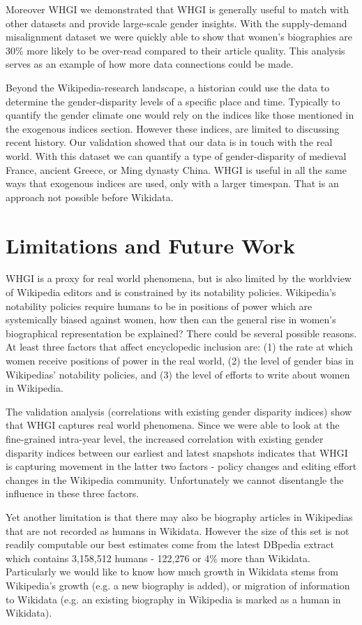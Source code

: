 \documentclass{sig-alternate-05-2015}
\begin{document}
Moreover WHGI we demonstrated that WHGI is generally useful to match with other datasets and provide large-scale gender insights. With the supply-demand misalignment dataset we were quickly able to show that women's biographies are 30\% more likely to be over-read compared to their article quality. This analysis serves as an example of how more data connections could be made. 

Beyond the Wikipedia-research landscape, a historian could use the data to determine the gender-disparity levels of a specific place and time. Typically to quantify the gender climate one would rely on the indices like those mentioned in the exogenous indices section. However these indices, are limited to discussing recent history. Our validation showed that our data is in touch with the real world. With this dataset we can quantify a type of gender-disparity of medieval France, ancient Greece, or Ming dynasty China. WHGI is useful in all the same ways that exogenous indices are used, only with a larger timespan. That is an approach not possible before Wikidata.

\section{Limitations and Future Work}
WHGI is a proxy for real world phenomena, but is also limited by the worldview of Wikipedia editors and is constrained by its notability policies. 
Wikipedia's notability policies require humans to be in positions of power which are systemically biased against women, how then can the general rise in women's biographical representation be explained? There could be several possible reasons. At least three factors that affect encyclopedic inclusion are: (1) the rate at which women receive positions of power in the real world, (2) the level of gender bias in Wikipedias' notability policies, and (3) the level of efforts to write about women in Wikipedia. 

The validation analysis (correlations with existing gender disparity indices) show that WHGI captures real world phenomena. Since we were able to look at the fine-grained intra-year level, the increased correlation with existing gender disparity indices between our earliest and latest snapshots indicates that WHGI is capturing movement in the latter two factors - policy changes and editing effort changes in the Wikipedia community. Unfortunately we cannot disentangle the influence in these three factors.

Yet another limitation is that there may also be biography articles in Wikipedias that are not recorded as humans in Wikidata. However the size of this set is not readily computable our best estimates come from the latest DBpedia extract which contains 3,158,512 humans - 122,276 or 4\% more than Wikidata. Particularly we would like to know how much growth in Wikidata stems from Wikipedia's growth (e.g. a new biography is added), or migration of information to Wikidata (e.g. an existing biography in Wikipedia is marked as a human in Wikidata).
\end{document}
